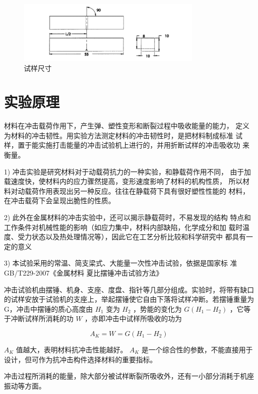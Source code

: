 \documentclass{article}
\begin{document}
\begin{figure}[h]
    \centering
    \includegraphics[width=0.8\textwidth]{img1.png}
    \caption{试样尺寸}
    \label{fig:diff_circuit}
\end{figure}

\section{实验原理}
材料在冲击载荷作用下，产生弹、塑性变形和断裂过程中吸收能量的能力，
定义为材料的冲击韧性。用实验方法测定材料的冲击韧性时，是把材料制成标准
试样，置于能实施打击能量的冲击试验机上进行的，并用折断试样的冲击吸收功
来衡量。

1) 冲击实验是研究材料对于动载荷抗力的一种实验，和静载荷作用不同，
由于加载速度快，使材料内的应力骤然提高，变形速度影响了材料的机构性质，
所以材料对动载荷作用表现出另一种反应。往往在静载荷下具有很好塑性性能的
材料，在冲击载荷下会呈现出脆性的性质。

2) 此外在金属材料的冲击实验中，还可以揭示静载荷时，不易发现的结构
特点和工作条件对机械性能的影响（如应力集中，材料内部缺陷，化学成分和加
载时温度、受力状态以及热处理情况等），因此它在工艺分析比较和科学研究中
都具有一定的意义 

3) 本试验采用的常温、简支梁式、大能量一次性冲击试验，依据是国家标
准 GB/T229-2007《金属材料 夏比摆锤冲击试验方法》

冲击试验机由摆锤、机身、支座、度盘、指针等几部分组成。实验时，将带有缺口的试样安放于试验机的支座上，举起摆锤使它自由下落将试样冲断。若摆锤重量为 G，冲击中摆锤的质心高度由 $H_1$ 变为 $H_2$ ，势能的变化为 $G\left(H_1-H_2\right)$ ，它等于冲断试样所消耗的功 $W$ ，亦即冲击中试样所吸收的功为

$$
A_K=W=G\left(H_1-H_2\right)
$$

$A_K$ 值越大，表明材料抗冲击性能越好。 $A_K$ 是一个综合性的参数，不能直接用于设计，但可作为抗冲击构件选择材料的重要指标。

冲击过程所消耗的能量，除大部分被试样断裂所吸收外，还有一小部分消耗于机座振动等方面。
\end{document}

